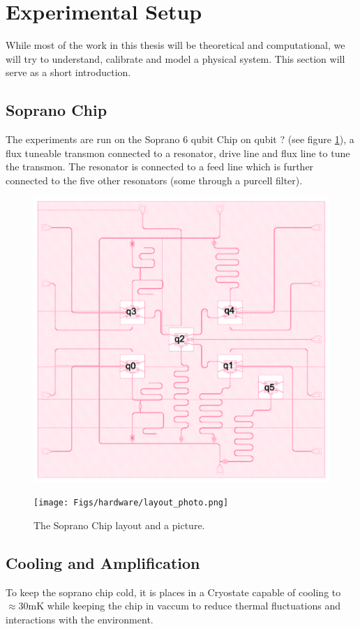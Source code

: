 \section{Experimental Setup}
While most of the work in this thesis will be theoretical and computational, we will try to understand, calibrate and model a physical system. This section will serve as a short introduction.

\subsection{Soprano Chip}
The experiments are run on the Soprano 6 qubit Chip on qubit ? (see figure \ref{fig:soprano}), a flux tuneable transmon connected to a resonator, drive line and flux line to tune the transmon. The resonator is connected to a feed line which is further connected to the five other resonators (some through a purcell filter).

\begin{figure}[h]
    \begin{minipage}{0.50\textwidth}
        \centering
        \includegraphics[height = 5 cm]{Figs/hardware/layout.png}
    \end{minipage}
        \begin{minipage}{0.50\textwidth}
        \centering
        \texttt{[image: Figs/hardware/layout\_photo.png]}
    \end{minipage}
    \caption{The Soprano Chip layout and a picture.}
    \label{fig:soprano}
\end{figure}

\subsection{Cooling and Amplification}
To keep the soprano chip cold, it is places in a Cryostate capable of cooling to $\approx 30 \text{mK}$ while keeping the chip in vaccum to reduce thermal fluctuations and interactions with the environment. 

